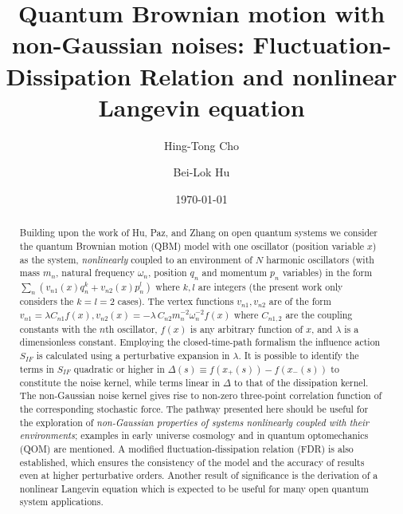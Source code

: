 \documentclass[%
amssymb,preprint,preprintnumbers,nofootinbib,superscriptaddress]{revtex4}
\begin{document}
\title{Quantum Brownian motion with non-Gaussian noises: Fluctuation-Dissipation Relation and nonlinear Langevin equation}
\author{Hing-Tong Cho}
\author{Bei-Lok Hu}

\begin{abstract}
Building upon the work of Hu, Paz, and Zhang \cite{HPZ92,HPZ93} on open quantum systems we consider the quantum Brownian motion (QBM) model with one oscillator (position variable $x$) as the system,   {\it nonlinearly} coupled to an environment of $N$ harmonic oscillators (with mass $m_n$, natural frequency $\omega_n$, position  $q_n$ and  momentum $p_n$ variables)  in the form  $\sum_{n}\left(v_{n1}(x)q_{n}^{k}+v_{n2}(x)p_{n}^{l}\right)$ where $k, l$ are integers
(the present work only considers the $k=l=2$ cases). The vertex functions $v_{n1}, v_{n2} $ are of the form $v_{n1}=\lambda C_{n1} f(x), v_{n2}(x)=-\lambda\,C_{n2}m_{n}^{-2}\omega_{n}^{-2}f(x)$ where $C_{n1,2}$ are the coupling constants with the $n$th oscillator, $f(x)$ is any arbitrary function of $x$, and $\lambda$ is a dimensionless constant. Employing the closed-time-path formalism  the influence action  $S_{IF}$ is calculated using a perturbative expansion in  $\lambda$. It is possible to identify the terms in $S_{IF}$ quadratic or higher in $\Delta(s)\equiv f(x_{+}(s))-f(x_{-}(s))$ to constitute the noise kernel, while terms linear in $\Delta$ to that of the dissipation kernel. The non-Gaussian noise kernel  gives rise to non-zero three-point correlation function of the corresponding stochastic force. The pathway presented here should be useful for the exploration of \textit{non-Gaussian properties of systems nonlinearly coupled with their environments}; examples in early universe cosmology and in quantum optomechanics (QOM) are mentioned.  A modified fluctuation-dissipation relation (FDR) is also established, which ensures the consistency of the model and the accuracy of results even at higher perturbative orders. Another result of significance is the derivation of a nonlinear Langevin equation which is expected to be useful for many open quantum system applications.
\end{abstract}
\date{\today}
\maketitle
\tableofcontents
\end{document}

